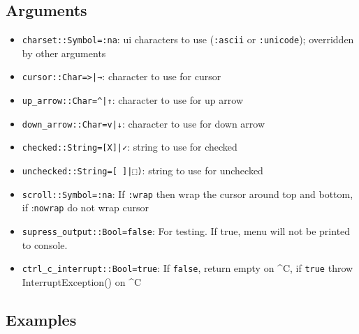 \hypertarget{10322653734691696332}{}


\subsection{Arguments}



\begin{itemize}
\item \texttt{charset::Symbol=:na}: ui characters to use (\texttt{:ascii} or \texttt{:unicode}); overridden by other arguments


\item \texttt{cursor::Char={\textquotesingle}>{\textquotesingle}|{\textquotesingle}→{\textquotesingle}}: character to use for cursor


\item \texttt{up\_arrow::Char={\textquotesingle}{\textasciicircum}{\textquotesingle}|{\textquotesingle}↑{\textquotesingle}}: character to use for up arrow


\item \texttt{down\_arrow::Char={\textquotesingle}v{\textquotesingle}|{\textquotesingle}↓{\textquotesingle}}: character to use for down arrow


\item \texttt{checked::String={\textquotedbl}[X]{\textquotedbl}|{\textquotedbl}✓{\textquotedbl}}: string to use for checked


\item \texttt{unchecked::String={\textquotedbl}[ ]{\textquotedbl}|{\textquotedbl}⬚{\textquotedbl})}: string to use for unchecked


\item \texttt{scroll::Symbol=:na}: If \texttt{:wrap} then wrap the cursor around top and bottom, if :\texttt{nowrap} do not wrap cursor


\item \texttt{supress\_output::Bool=false}: For testing. If true, menu will not be printed to console.


\item \texttt{ctrl\_c\_interrupt::Bool=true}: If \texttt{false}, return empty on {\textasciicircum}C, if \texttt{true} throw InterruptException() on {\textasciicircum}C

\end{itemize}


\hypertarget{18222617908278532347}{}


\subsection{Examples}





